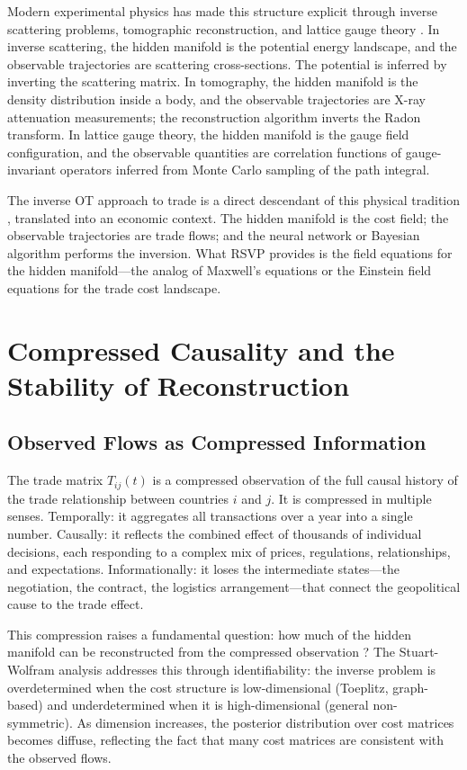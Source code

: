 \documentclass[12pt]{article}
\begin{document}
Modern experimental physics has made this structure explicit through inverse scattering problems, tomographic reconstruction, and lattice gauge theory \citep{tarantola2005, kaipio2006}. In inverse scattering, the hidden manifold is the potential energy landscape, and the observable trajectories are scattering cross-sections. The potential is inferred by inverting the scattering matrix. In tomography, the hidden manifold is the density distribution inside a body, and the observable trajectories are X-ray attenuation measurements; the reconstruction algorithm inverts the Radon transform. In lattice gauge theory, the hidden manifold is the gauge field configuration, and the observable quantities are correlation functions of gauge-invariant operators inferred from Monte Carlo sampling of the path integral.

The inverse OT approach to trade is a direct descendant of this physical tradition \citep{villani2003, peyre2019}, translated into an economic context. The hidden manifold is the cost field; the observable trajectories are trade flows; and the neural network or Bayesian algorithm performs the inversion. What RSVP provides is the field equations for the hidden manifold---the analog of Maxwell's equations or the Einstein field equations for the trade cost landscape.

\section{Compressed Causality and the Stability of Reconstruction}

\subsection{Observed Flows as Compressed Information}

The trade matrix $T_{ij}(t)$ is a compressed observation of the full causal history of the trade relationship between countries $i$ and $j$. It is compressed in multiple senses. Temporally: it aggregates all transactions over a year into a single number. Causally: it reflects the combined effect of thousands of individual decisions, each responding to a complex mix of prices, regulations, relationships, and expectations. Informationally: it loses the intermediate states---the negotiation, the contract, the logistics arrangement---that connect the geopolitical cause to the trade effect.

This compression raises a fundamental question: how much of the hidden manifold can be reconstructed from the compressed observation \citep[cf.\ the general theory of causal inference from compressed data in][]{pearl2009, cover2006}? The Stuart-Wolfram analysis addresses this through identifiability: the inverse problem is overdetermined when the cost structure is low-dimensional (Toeplitz, graph-based) and underdetermined when it is high-dimensional (general non-symmetric). As dimension increases, the posterior distribution over cost matrices becomes diffuse, reflecting the fact that many cost matrices are consistent with the observed flows.
\end{document}
